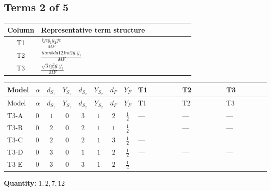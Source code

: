 \documentclass[8pt]{article}
\begin{document}
\begin{landscape}
\subsection*{Terms 2 of 5}
\begin{center}
\begin{tabular}{@{}c >{\raggedright\arraybackslash}p{0.82\linewidth}@{}}
\toprule
Column & Representative term structure \\
\midrule
T1 & \(\displaystyle \frac{i ye \overline{y_{1}} \overline{y_{2}} \overline{ye}}{MF}\) \\
\midrule
T2 & \(\displaystyle \frac{i lambda12Inv2 \overline{y_{1}} \overline{y_{2}}}{MF}\) \\
\midrule
T3 & \(\displaystyle \frac{\sqrt{3} i g_{2}^{2} \overline{y_{1}} \overline{y_{2}}}{MF}\) \\
\midrule
\bottomrule
\end{tabular}
\end{center}
\smallskip
\tiny
\begin{longtable}{@{}llcccccc >{\raggedright\arraybackslash}p{0.21\linewidth} >{\raggedright\arraybackslash}p{0.21\linewidth} >{\raggedright\arraybackslash}p{0.21\linewidth}@{}}
\toprule
Model & $\alpha$ & $d_{S_1}$ & $Y_{S_1}$ & $d_{S_2}$ & $Y_{S_2}$ & $d_F$ & $Y_F$ & T1 & T2 & T3 \\
\midrule
\endfirsthead
\toprule
Model & $\alpha$ & $d_{S_1}$ & $Y_{S_1}$ & $d_{S_2}$ & $Y_{S_2}$ & $d_F$ & $Y_F$ & T1 & T2 & T3 \\
\midrule
\endhead
T3-A & $0$ & $1$ & $0$ & $3$ & $1$ & $2$ & $\frac{1}{2}$ & --- & --- & --- \\
\midrule
T3-B & $0$ & $2$ & $0$ & $2$ & $1$ & $1$ & $\frac{1}{2}$ & \scriptsize\adjustbox{max width=\linewidth}{$\begin{gathered} \frac{i ye \overline{y_{1}} \overline{y_{2}} \overline{ye}}{8 MF}\end{gathered}$} & --- & --- \\
\midrule
T3-C & $0$ & $2$ & $0$ & $2$ & $1$ & $3$ & $\frac{1}{2}$ & --- & \scriptsize\adjustbox{max width=\linewidth}{$\begin{gathered} \frac{i lambda12Inv2 \overline{y_{1}} \overline{y_{2}}}{6 MF}\end{gathered}$} & \scriptsize\adjustbox{max width=\linewidth}{$\begin{gathered} \frac{\sqrt{3} i g_{2}^{2} \overline{y_{1}} \overline{y_{2}}}{8 MF}\end{gathered}$} \\
\midrule
T3-D & $0$ & $3$ & $0$ & $1$ & $1$ & $2$ & $\frac{1}{2}$ & --- & --- & --- \\
\midrule
T3-E & $0$ & $3$ & $0$ & $3$ & $1$ & $2$ & $\frac{1}{2}$ & --- & --- & --- \\
\midrule
\bottomrule
\end{longtable}
\clearpage
\noindent\textbf{Quantity: }$\mathrm{1,2,7,12}$\par\smallskip

\end{landscape}
\end{document}
